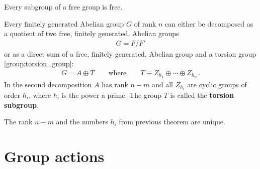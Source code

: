     \begin{property}
        Every subgroup of a free group is free.
    \end{property}

    \begin{theorem}\label{group:theorem:free_group}
        Every finitely generated Abelian group $G$ of rank $n$ can either be decomposed as a quotient of two free, finitely generated, Abelian groups
        \begin{gather}
            G = F/F'
        \end{gather}
        or as a direct sum of a free, finitely generated, Abelian group and a torsion group \ref{group:torsion_group}:
        \begin{gather}
            G = A\oplus T\qquad\text{where}\qquad T\equiv Z_{h_1}\oplus\cdots\oplus Z_{h_m}.
        \end{gather}
        In the second decomposition $A$ has rank $n-m$ and all $Z_{h_i}$ are cyclic groups of order $h_i$, where $h_i$ is the power a prime. The group $T$ is called the \textbf{torsion subgroup}.
    \end{theorem}
    \begin{property}[Uniqueness]
        The rank $n-m$ and the numbers $h_i$ from previous theorem are unique.
    \end{property}

\section{Group actions}\label{section:group_actions}

